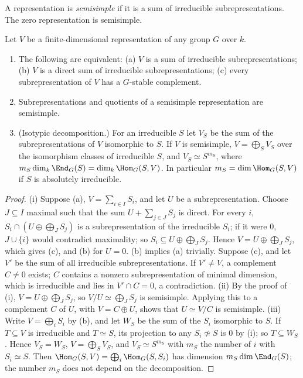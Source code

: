 \begin{definition}\label{def:reps:semisimple}
A representation is \emph{semisimple} if it is a sum of irreducible subrepresentations. The zero representation is semisimple.
\end{definition}

\begin{proposition}\label{prop:reps:semisimple}
Let $V$ be a finite-dimensional representation of any group $G$ over $k$.
\begin{enumerate}[label=(\roman*)]
\item The following are equivalent: (a) $V$ is a sum of irreducible subrepresentations; (b) $V$ is a direct sum of irreducible
subrepresentations; (c) every subrepresentation of $V$ has a $G$-stable complement.
\item Subrepresentations and quotients of a semisimple representation are semisimple.
\item (Isotypic decomposition.) For an irreducible $S$ let $V_S$ be the sum of the subrepresentations of $V$ isomorphic to $S$. If $V$
is semisimple, $V=\bigoplus_SV_S$ over the isomorphism classes of irreducible $S$, and $V_S\simeq S^{m_S}$, where $m_S\dim_k\End_G(S)=\dim_k\Hom_G(S,V)$.
In particular $m_S=\dim\Hom_G(S,V)$ if $S$ is absolutely irreducible.
\end{enumerate}
\end{proposition}

\begin{proof}
(i) Suppose (a), $V=\sum_{i\in I}S_i$, and let $U$ be a subrepresentation. Choose $J\subseteq I$ maximal such that the sum $U+\sum_{j\in J}S_j$ is
direct. For every $i$, $S_i\cap(U\oplus\bigoplus_JS_j)$ is a subrepresentation of the irreducible $S_i$; if it were $0$, $J\cup\{i\}$ would
contradict maximality; so $S_i\subseteq U\oplus\bigoplus_JS_j$. Hence $V=U\oplus\bigoplus_JS_j$, which gives (c), and (b) for $U=0$. (b) implies (a)
trivially. Suppose (c), and let $V'$ be the sum of all irreducible subrepresentations. If $V'\ne V$, a complement $C\ne0$ exists; $C$
contains a nonzero subrepresentation of minimal dimension, which is irreducible and lies in $V'\cap C=0$, a contradiction.
(ii) By the proof of (i), $V=U\oplus\bigoplus_JS_j$, so $V/U\simeq\bigoplus_JS_j$ is semisimple. Applying this to a complement $C$ of $U$, with
$V=C\oplus U$, shows that $U\simeq V/C$ is semisimple.
(iii) Write $V=\bigoplus_iS_i$ by (b), and let $W_S$ be the sum of the $S_i$ isomorphic to $S$. If $T\subseteq V$ is irreducible and $T\simeq S$, its
projection to any $S_i\not\simeq S$ is $0$ by (i); so $T\subseteq W_S$. Hence $V_S=W_S$, $V=\bigoplus_SV_S$, and $V_S\simeq S^{m_S}$ with $m_S$
the number of $i$ with $S_i\simeq S$. Then $\Hom_G(S,V)=\bigoplus_i\Hom_G(S,S_i)$ has dimension $m_S\dim\End_G(S)$; the number $m_S$ does not
depend on the decomposition.
\end{proof}

